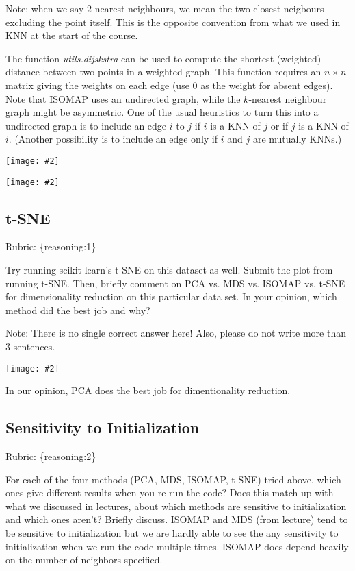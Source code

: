 \documentclass{article}
\def\rubric#1{\gre{Rubric: \{#1\}}}{}
\def\blu#1{{\color{blu}#1}}
\def\gre#1{{\color{gre}#1}}
\def\red#1{{\color{red}#1}}
\newcommand{\centerfig}[2]{\begin{center}\texttt{[image: \#2]}\end{center}}
\begin{document}
Note: when we say $2$ nearest neighbours, we mean the two closest neigbours excluding the point itself. This is the opposite convention from what we used in KNN at the start of the course.

The function \emph{utils.dijskstra} can be used to compute the shortest (weighted) distance between two points in a weighted graph.
This function requires an $n \times n$ matrix giving the weights on each edge (use $0$ as the weight for absent edges).
Note that ISOMAP uses an undirected graph, while the $k$-nearest neighbour graph might be asymmetric.
One of the usual heuristics to turn this into a undirected graph is to include an edge $i$ to $j$ if $i$ is a KNN of $j$ or if $j$ is a KNN of $i$.
(Another possibility is to include an edge only if $i$ and $j$ are mutually KNNs.)

\centerfig{.5}{./figs/ISOMAP2_animals.png}
\centerfig{.5}{./figs/ISOMAP3_animals.png}

\subsection{t-SNE}
\rubric{reasoning:1}

Try running scikit-learn's t-SNE on this dataset as well. \blu{Submit the plot from running t-SNE. Then, briefly comment on PCA vs. MDS vs. ISOMAP vs. t-SNE for dimensionality reduction on this particular data set. In your opinion, which method did the best job and why?}

Note: There is no single correct answer here! Also, please do not write more than 3 sentences.

\centerfig{.5}{./figs/TSNE_animals.png}
\red{In our opinion, PCA does the best job for dimentionality reduction.}
\subsection{Sensitivity to Initialization}
\rubric{reasoning:2}

For each of the four methods (PCA, MDS, ISOMAP, t-SNE) tried above, which ones give different results when you re-run the code? Does this match up with what we discussed in lectures, about which methods are sensitive to initialization and which ones aren't? Briefly discuss.
\red{ISOMAP and MDS (from lecture) tend to be sensitive to initialization but we are hardly able to see the any sensitivity to initialization when we run the code multiple times. ISOMAP does depend heavily on the number of neighbors specified.}
\end{document}

